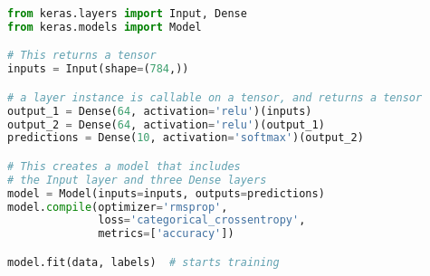 \begin{lstlisting}[float={ht},caption={This is an example listing.},label={lst:one},language=Python,upquote=true]
from keras.layers import Input, Dense
from keras.models import Model

# This returns a tensor
inputs = Input(shape=(784,))

# a layer instance is callable on a tensor, and returns a tensor
output_1 = Dense(64, activation='relu')(inputs)
output_2 = Dense(64, activation='relu')(output_1)
predictions = Dense(10, activation='softmax')(output_2)

# This creates a model that includes
# the Input layer and three Dense layers
model = Model(inputs=inputs, outputs=predictions)
model.compile(optimizer='rmsprop',
              loss='categorical_crossentropy',
              metrics=['accuracy'])

model.fit(data, labels)  # starts training
\end{lstlisting}